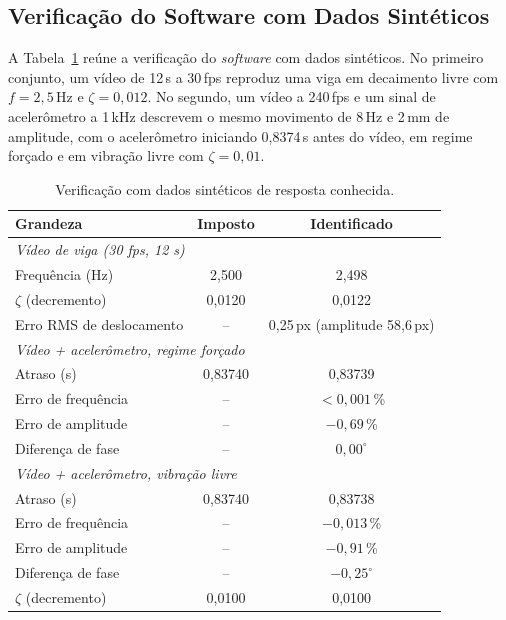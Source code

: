 \documentclass[a4paper,10pt,twocolumn]{article}
\begin{document}
\subsection{Verificação do Software com Dados Sintéticos}
\label{sec:res_sintetico}

A Tabela~\ref{tab:sintetico} reúne a verificação do \textit{software} com dados sintéticos. No primeiro conjunto, um vídeo de 12\,s a 30\,fps reproduz uma viga em decaimento livre com $f = 2{,}5$\,Hz e $\zeta = 0{,}012$. No segundo, um vídeo a 240\,fps e um sinal de acelerômetro a 1\,kHz descrevem o mesmo movimento de 8\,Hz e 2\,mm de amplitude, com o acelerômetro iniciando 0,8374\,s antes do vídeo, em regime forçado e em vibração livre com $\zeta = 0{,}01$.

\begin{table}[htbp]
    \centering
    \caption{Verificação com dados sintéticos de resposta conhecida.}
    \label{tab:sintetico}
    \small
    \begin{tabularx}{\columnwidth}{X c c}
        \toprule
        \textbf{Grandeza} & \textbf{Imposto} & \textbf{Identificado} \\
        \midrule
        \multicolumn{3}{l}{\textit{Vídeo de viga (30 fps, 12 s)}} \\
        Frequência (Hz) & 2,500 & 2,498 \\
        $\zeta$ (decremento) & 0,0120 & 0,0122 \\
        Erro RMS de deslocamento & -- & 0,25\,px (amplitude 58,6\,px) \\
        \midrule
        \multicolumn{3}{l}{\textit{Vídeo + acelerômetro, regime forçado}} \\
        Atraso (s) & 0,83740 & 0,83739 \\
        Erro de frequência & -- & $< 0{,}001$\,\% \\
        Erro de amplitude & -- & $-0{,}69$\,\% \\
        Diferença de fase & -- & $0{,}00^\circ$ \\
        \midrule
        \multicolumn{3}{l}{\textit{Vídeo + acelerômetro, vibração livre}} \\
        Atraso (s) & 0,83740 & 0,83738 \\
        Erro de frequência & -- & $-0{,}013$\,\% \\
        Erro de amplitude & -- & $-0{,}91$\,\% \\
        Diferença de fase & -- & $-0{,}25^\circ$ \\
        $\zeta$ (decremento) & 0,0100 & 0,0100 \\
        \bottomrule
    \end{tabularx}
\end{table}
\end{document}
